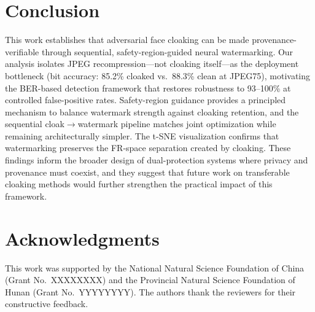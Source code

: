 \documentclass[preprint,12pt]{elsarticle}
\begin{document}
\section{Conclusion}
\label{sec:conclusion}
This work establishes that adversarial face cloaking can be made provenance-verifiable through sequential, safety-region-guided neural watermarking. Our analysis isolates JPEG recompression---not cloaking itself---as the deployment bottleneck (bit accuracy: 85.2\% cloaked vs.\ 88.3\% clean at JPEG75), motivating the BER-based detection framework that restores robustness to 93--100\% at controlled false-positive rates. Safety-region guidance provides a principled mechanism to balance watermark strength against cloaking retention, and the sequential cloak$\rightarrow$watermark pipeline matches joint optimization while remaining architecturally simpler. The t-SNE visualization confirms that watermarking preserves the FR-space separation created by cloaking. These findings inform the broader design of dual-protection systems where privacy and provenance must coexist, and they suggest that future work on transferable cloaking methods would further strengthen the practical impact of this framework.

\section*{Acknowledgments}
This work was supported by the National Natural Science Foundation of China (Grant No.~XXXXXXXX) and the Provincial Natural Science Foundation of Hunan (Grant No.~YYYYYYYY). The authors thank the reviewers for their constructive feedback.
\end{document}
